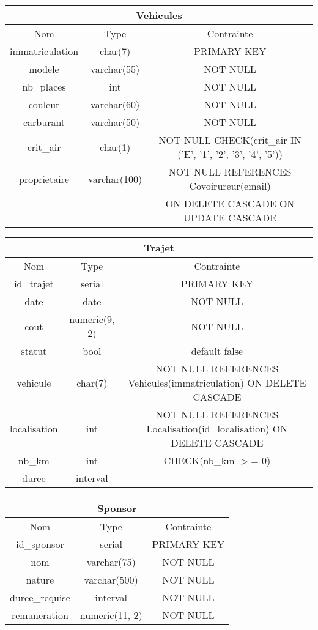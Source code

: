 \begin{center}
		\begin{tabular}{|c|c|c|}
			\hline
			\multicolumn{3}{|c|}{Vehicules}\\
			\hline
			Nom & Type & Contrainte \\
			\hline
			immatriculation & char(7) & PRIMARY KEY \\\hline
			modele & varchar(55) & NOT NULL \\\hline
			nb\_places & int & NOT NULL \\\hline
			couleur & varchar(60) & NOT NULL \\\hline
			carburant & varchar(50) & NOT NULL \\\hline
			crit\_air & char(1) & NOT NULL CHECK(crit\_air IN ('E', '1', '2', '3', '4', '5')) \\\hline
			proprietaire & varchar(100) & NOT NULL REFERENCES Covoirureur(email) \\
			&&  ON DELETE CASCADE ON UPDATE CASCADE \\\hline
		\end{tabular}
		
		\begin{tabular}{|c|c|c|}
				\hline
			\multicolumn{3}{|c|}{Trajet}\\
			\hline
			Nom & Type & Contrainte \\
			\hline
			id\_trajet & serial & PRIMARY KEY \\\hline
			date & date & NOT NULL \\\hline
			cout & numeric(9, 2) & NOT NULL \\\hline
			statut & bool & default false \\\hline
			vehicule & char(7) & NOT NULL REFERENCES Vehicules(immatriculation) ON DELETE CASCADE \\\hline
			localisation & int & NOT NULL REFERENCES Localisation(id\_localisation) ON DELETE CASCADE \\\hline
			nb\_km & int & CHECK(nb\_km $>$= 0)  \\\hline
			duree & interval &\\\hline
		\end{tabular}
		
		\begin{tabular}{|c|c|c|}
			\hline
			\multicolumn{3}{|c|}{Sponsor}\\
			\hline
			Nom & Type & Contrainte \\
			\hline
			id\_sponsor & serial & PRIMARY KEY \\\hline
			nom & varchar(75) & NOT NULL \\\hline
			nature & varchar(500) & NOT NULL \\\hline
			duree\_requise & interval & NOT NULL \\\hline
			remuneration & numeric(11, 2) & NOT NULL\\\hline
		\end{tabular}
		

\end{center}

